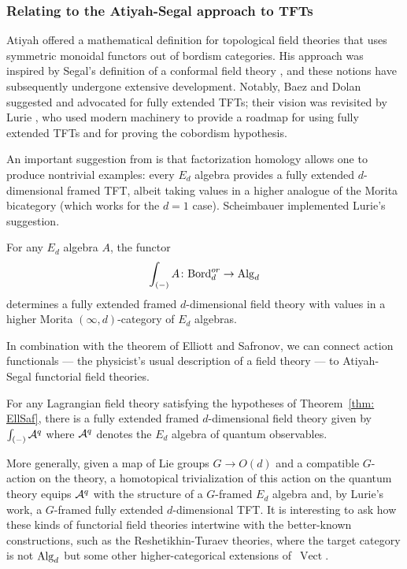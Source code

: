 \documentclass[11pt]{amsart}
\def\Vect{\operatorname{Vect}}
\begin{document}
\subsubsection{Relating to the Atiyah-Segal approach to TFTs}
\label{sec: reln to functorial TFT}

Atiyah \cite{AtiTFT} offered a mathematical definition for topological field theories that uses symmetric monoidal functors out of bordism categories.
His approach was inspired by Segal's definition of a conformal field theory \cite{SegCFT},
and these notions have subsequently undergone extensive development.
Notably, Baez and Dolan \cite{BaeDol} suggested and advocated for fully extended TFTs; 
their vision was revisited by Lurie \cite{LurieTFT}, who used modern machinery to provide a roadmap for using fully extended TFTs and for proving the cobordism hypothesis.

An important suggestion from \cite{LurieTFT} is that factorization homology allows one to produce nontrivial examples: 
every $E_d$ algebra provides a fully extended $d$-dimensional framed TFT,
albeit taking values in a higher analogue of the Morita bicategory (which works for the $d=1$ case).
Scheimbauer \cite{Scheim} implemented Lurie's suggestion.

\begin{thm}
For any $E_d$ algebra $A$, the functor
\[
\int_{(-)} A \colon {\rm Bord}^{or}_d \to {\rm Alg}_d
\]
determines a fully extended framed $d$-dimensional field theory with values in a higher Morita $(\infty,d)$-category of $E_d$ algebras.
\end{thm}

In combination with the theorem of Elliott and Safronov, we can connect action functionals --- the physicist's usual description of a field theory --- to Atiyah-Segal functorial field theories.

\begin{cor}
For any Lagrangian field theory satisfying the hypotheses of Theorem~\ref{thm: EllSaf}, 
there is a fully extended framed $d$-dimensional field theory 
given by $\int_{(-)} \mathcal A^q$ where $\mathcal A^q$ denotes the $E_d$ algebra of quantum observables.
\end{cor}

More generally, given a map of Lie groups $G \to O(d)$ and a compatible $G$-action on the theory, 
a homotopical trivialization of this action on the quantum theory equips $\mathcal A^q$ with the structure of a $G$-framed $E_d$ algebra and, by Lurie's work, a $G$-framed fully extended $d$-dimensional TFT.
It is interesting to ask how these kinds of functorial field theories intertwine with the better-known constructions,
such as the Reshetikhin-Turaev theories, 
where the target category is not ${\rm Alg}_d$ but some other higher-categorical extensions of~$\Vect$.
\end{document}

